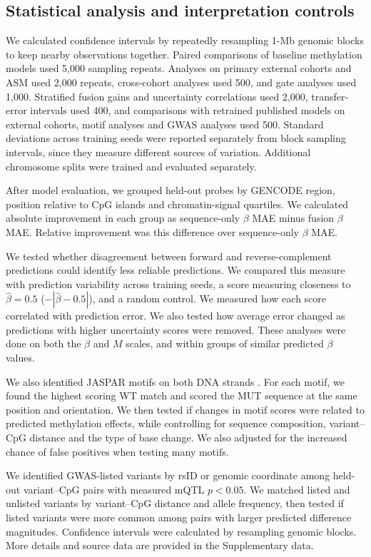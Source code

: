 \documentclass[11pt,letterpaper]{article}
\begin{document}
\subsection{Statistical analysis and interpretation controls}
We calculated confidence intervals by repeatedly resampling  1-Mb genomic blocks to keep nearby observations together. Paired comparisons of baseline methylation models used 5,000 sampling repeats. Analyses on primary external cohorts and ASM used 2,000 repeats, cross-cohort analyses used 500, and gate analyses used 1,000. Stratified fusion gains and uncertainty correlations used 2,000, transfer-error intervals used 400, and comparisons with retrained published models on external cohorts, motif analyses and GWAS analyses used 500. Standard deviations across training seeds were reported separately from block sampling intervals, since they measure different sources of variation. Additional chromosome splits were trained and evaluated separately. 

After model evaluation, we grouped held-out probes by GENCODE region, position relative to CpG islands and chromatin-signal quartiles. We calculated absolute improvement in each group as sequence-only $\beta$ MAE minus fusion $\beta$ MAE. Relative improvement was this difference over sequence-only $\beta$ MAE.

We tested whether disagreement between forward and reverse-complement predictions could identify less reliable predictions. We compared this measure with prediction variability across training seeds, a score measuring closeness to $\widehat\beta=0.5$ ($-|\widehat\beta-0.5|$), and a random control. We measured how each score correlated with prediction error. We also tested how average error changed as predictions with higher uncertainty scores were removed. These analyses were done on both the $\beta$ and $M$ scales, and within groups of similar predicted $\beta$ values.

We also identified JASPAR motifs on both DNA strands \cite{rauluseviciute2024jaspar}. For each motif, we found the highest scoring WT match and scored the MUT sequence at the same position and orientation. We then tested if changes in motif scores were related to predicted methylation effects, while controlling for sequence composition, variant--CpG distance and the type of base change. We also adjusted for the increased chance of false positives when testing many motifs.

We identified GWAS-listed variants \cite{cerezo2025gwas} by rsID or genomic coordinate among held-out variant--CpG pairs with measured mQTL $p<0.05$. We matched listed and unlisted variants by variant--CpG distance and allele frequency, then tested if listed variants were more common among pairs with larger predicted difference magnitudes. Confidence intervals were calculated by resampling genomic blocks. More details and source data are provided in the Supplementary data.
\end{document}
